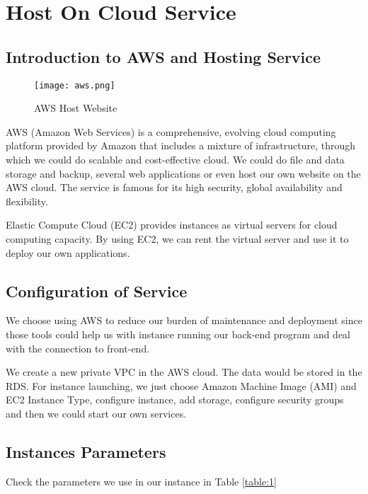 \documentclass[11pt]{article}
\begin{document}
\newpage

\section{Host On Cloud Service}

\subsection{Introduction to AWS and Hosting Service}
\begin{figure}[htp]
    \centering
    \texttt{[image: aws.png]}
    \caption{AWS Host Website}
    \label{fig:galaxy}
\end{figure}

AWS (Amazon Web Services) is a comprehensive, evolving cloud computing platform provided by Amazon that includes a mixture of infrastructure, through which we could do scalable and cost-effective cloud. We could do file and data storage and backup, several web applications or even host our own website on the AWS cloud. The service is famous for its high security, global availability and flexibility.

Elastic Compute Cloud (EC2) provides instances as virtual servers for cloud computing capacity. By using EC2, we can rent the virtual server and use it to deploy our own applications.


\subsection{Configuration of Service}
We choose using AWS to reduce our burden of maintenance and deployment since those tools could help us with instance running our back-end program and deal with the connection to front-end.

We create a new private VPC in the AWS cloud. The data would be stored in the RDS. For instance launching, we just choose Amazon Machine Image (AMI) and EC2 Instance Type, configure instance, add storage, configure security groups and then we could start our own services.

\subsection{Instances Parameters}
Check the parameters we use in our instance in Table  \ref{table:1} 
\end{document}
